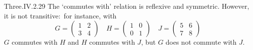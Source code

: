 \begin{ans}{Three.IV.2.29}
      The `commutes with' relation is reflexive and symmetric.
      However, it is not transitive:~for instance, with
      \begin{equation*}
        G=\begin{pmatrix}
          1  &2  \\
          3  &4
        \end{pmatrix}
        \quad
        H=\begin{pmatrix}
          1  &0  \\
          0  &1
        \end{pmatrix}
        \quad
        J=\begin{pmatrix}
          5  &6  \\
          7  &8
        \end{pmatrix}
      \end{equation*}
      $G$ commutes with $H$ and $H$ commutes with $J$, but $G$ does not
      commute with $J$.
    
\end{ans}
